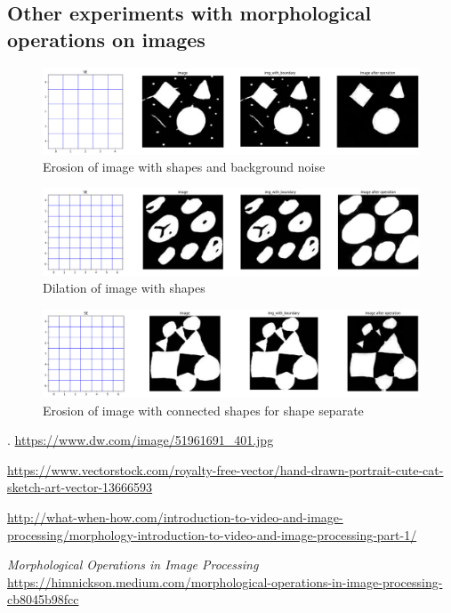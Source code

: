 \documentclass{article}
\begin{document}
\subsection{Other experiments with morphological operations on images}
\begin{figure}[h!]
\includegraphics[width=\linewidth]{images/sample_img1.png}
\caption{Erosion of image with shapes and background noise}
\label{fig:sample_1}
\end{figure}
\begin{figure}[h!]
\includegraphics[width=\linewidth]{images/sample_img2.png}
\caption{Dilation of image with shapes}
\label{fig:sample_2}
\end{figure}
\begin{figure}[h!]
\includegraphics[width=\linewidth]{images/sample_img3.png}
\caption{Erosion of image with connected shapes for shape separate }
\label{fig:sample_3}
\end{figure}

\begin{thebibliography}{9}

. 
\url{https://www.dw.com/image/51961691\_401.jpg}

\url{https://www.vectorstock.com/royalty-free-vector/hand-drawn-portrait-cute-cat-sketch-art-vector-13666593}

\url{http://what-when-how.com/introduction-to-video-and-image-processing/morphology-introduction-to-video-and-image-processing-part-1/}

\bibitem{} 
\textit{Morphological Operations in Image Processing}
\url{https://himnickson.medium.com/morphological-operations-in-image-processing-cb8045b98fcc}


\end{thebibliography}
\end{document}
